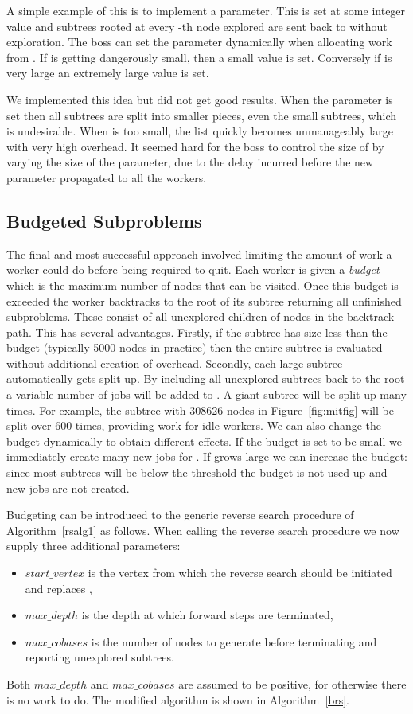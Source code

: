\documentclass[a4paper,11pt]{article}   \usepackage{authblk} \usepackage[top=1.9cm,bottom=1.9cm,left=1.9cm,right=1.9cm]{geometry}
\newcommand{\mymaxdepth}{\ensuremath{\mathit{max\_depth}}\xspace}
\newcommand{\maxcobases}{\ensuremath{\mathit{max\_cobases}}\xspace}
\newcommand{\startvertex}{\ensuremath{\mathit{start\_vertex}}\xspace}
\begin{document}
A simple example of this is to implement a  parameter. 
This is set at some integer value   and subtrees rooted
at every -th node explored are 
sent back to  without exploration. The boss
can set the  parameter dynamically when allocating work from .
If  is getting dangerously small, then a small value is set.
Conversely if  is very large an extremely large value is set.

We implemented this idea but did not get good results. 
When the 
parameter is set then all subtrees are split into smaller pieces,
even the small subtrees, which is undesirable.
When 
is too small, the list  quickly becomes unmanageably large
with very high overhead. 
It seemed hard for the boss to control the size of 
by varying the size of the parameter, due to the
delay incurred before the new parameter propagated to all the workers.

\subsection{Budgeted Subproblems}
\label{subsec:budg}

The final and 
most successful approach involved limiting
the amount of work a worker could do before being
required to quit. Each worker is given a \emph{budget}
which is the maximum number of nodes that can be visited.
Once this budget is exceeded the worker backtracks to the root
of its subtree returning all unfinished subproblems. These consist of all unexplored
children of nodes in the backtrack path.  This has several advantages.
Firstly, if the subtree has size less than the budget (typically 5000 nodes in practice)
then the entire subtree is evaluated without additional creation of overhead.
Secondly, each large subtree automatically gets split up. By including all
unexplored subtrees back to the root a variable number of jobs will be added to .
A giant subtree will be split up many times. For example, the
subtree with 308626 nodes in Figure~\ref{fig:mitfig} will be split over 600 times, providing
work for idle workers. We can also change the budget dynamically to obtain different effects.
If the budget is set to be small we immediately create many new jobs for . If
 grows large we can increase the budget: since most subtrees will be below
the threshold the budget is not used up and  new jobs are not created. 

Budgeting can be introduced to the generic reverse search procedure of Algorithm~\ref{rsalg1}
as follows.
When calling the reverse search procedure we now supply three additional parameters: 
\begin{itemize}
\item
\startvertex is the vertex from which the reverse search should be initiated and replaces ,
\item
\mymaxdepth is the depth at which forward steps are terminated,
\item
\maxcobases is the number of nodes to generate before terminating and reporting unexplored subtrees.
\end{itemize}
Both \mymaxdepth and \maxcobases are assumed to be positive, for otherwise there is no work to do.
The modified algorithm is shown in Algorithm~\ref{brs}. 
\end{document}
